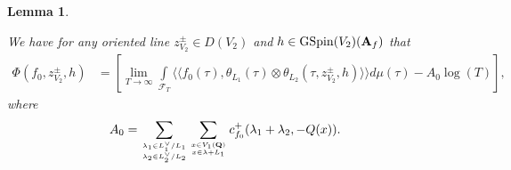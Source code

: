 \documentclass{amsart}
\newtheorem{lemma}[theorem]{Lemma}
\theoremstyle{definition}
\begin{document}
\begin{lemma}\label{4.5} 

We have for any oriented line $z_{V_2}^{\pm} \in D(V_2)$ and $h \in \operatorname{GSpin}(V_2)({\bf{A}}_f)$ that
\begin{align*} \Phi(f_0, z_{V_2}^{\pm}, h) &= \left[  \lim_{T \rightarrow \infty} 
\int\limits_{\mathcal{F}_T} \langle \langle f_0(\tau), \theta_{L_1}(\tau) \otimes \theta_{L_2}(\tau, z_{V_2}^{\pm}, h) \rangle \rangle d\mu(\tau) - A_0 \log(T) \right], \end{align*}
where 
\begin{align*} A_0  &= \sum\limits_{\lambda_1 \in L_1^{\vee}/L_1 \atop \lambda_2 \in L_2^{\vee}/L_2} 
\sum\limits_{x \in V_1({\bf{Q}}) \atop x \in \lambda + L_1} c_{f_0}^+(\lambda_1 + \lambda_2, - Q(x)). \end{align*} \end{lemma}
\end{document}
